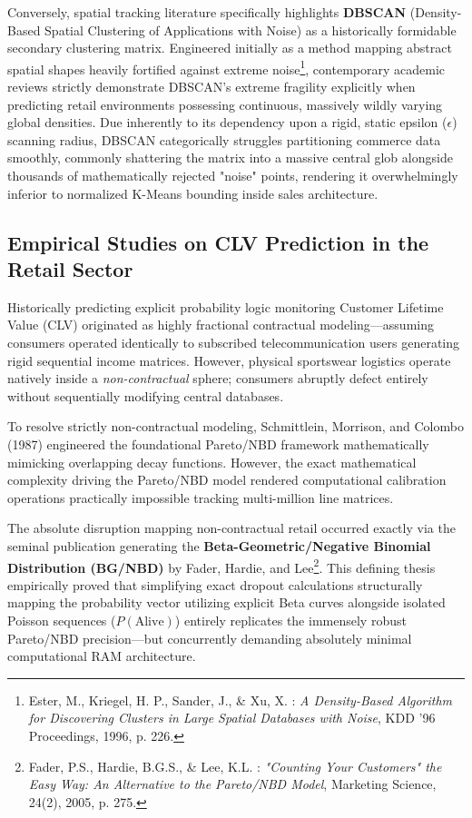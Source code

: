 \documentclass[12pt,a4paper]{report}
\begin{document}
Conversely, spatial tracking literature specifically highlights \textbf{DBSCAN} (Density-Based Spatial Clustering of Applications with Noise) as a historically formidable secondary clustering matrix. Engineered initially as a method mapping abstract spatial shapes heavily fortified against extreme noise\footnote{Ester, M., Kriegel, H. P., Sander, J., \& Xu, X. : \textit{A Density-Based Algorithm for Discovering Clusters in Large Spatial Databases with Noise}, KDD '96 Proceedings, 1996, p. 226.}, contemporary academic reviews strictly demonstrate DBSCAN’s extreme fragility explicitly when predicting retail environments possessing continuous, massively wildly varying global densities. Due inherently to its dependency upon a rigid, static epsilon ($\epsilon$) scanning radius, DBSCAN categorically struggles partitioning commerce data smoothly, commonly shattering the matrix into a massive central glob alongside thousands of mathematically rejected "noise" points, rendering it overwhelmingly inferior to normalized K-Means bounding inside sales architecture.

\subsection{Empirical Studies on CLV Prediction in the Retail Sector}
Historically predicting explicit probability logic monitoring Customer Lifetime Value (CLV) originated as highly fractional contractual modeling—assuming consumers operated identically to subscribed telecommunication users generating rigid sequential income matrices. However, physical sportswear logistics operate natively inside a \textit{non-contractual} sphere; consumers abruptly defect entirely without sequentially modifying central databases.

To resolve strictly non-contractual modeling, Schmittlein, Morrison, and Colombo (1987) engineered the foundational Pareto/NBD framework mathematically mimicking overlapping decay functions. However, the exact mathematical complexity driving the Pareto/NBD model rendered computational calibration operations practically impossible tracking multi-million line matrices.

The absolute disruption mapping non-contractual retail occurred exactly via the seminal publication generating the \textbf{Beta-Geometric/Negative Binomial Distribution (BG/NBD)} by Fader, Hardie, and Lee\footnote{Fader, P.S., Hardie, B.G.S., \& Lee, K.L. : \textit{"Counting Your Customers" the Easy Way: An Alternative to the Pareto/NBD Model}, Marketing Science, 24(2), 2005, p. 275.}. This defining thesis empirically proved that simplifying exact dropout calculations structurally mapping the probability vector utilizing explicit Beta curves alongside isolated Poisson sequences ($P(\text{Alive})$) entirely replicates the immensely robust Pareto/NBD precision—but concurrently demanding absolutely minimal computational RAM architecture.
\end{document}
